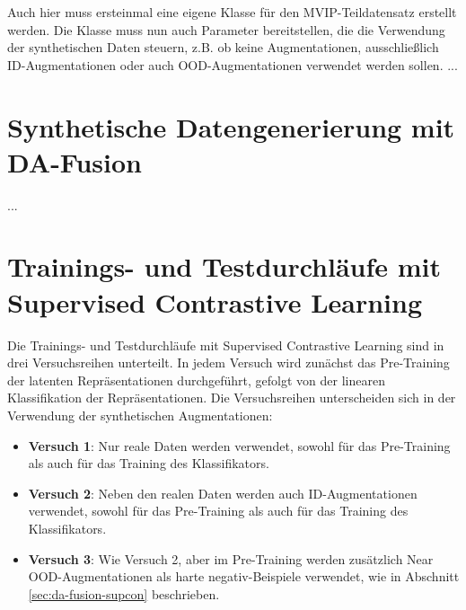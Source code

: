 Auch hier muss ersteinmal eine eigene Klasse für den MVIP-Teildatensatz erstellt werden. Die Klasse muss nun auch Parameter bereitstellen, die die Verwendung der synthetischen Daten steuern, z.B. ob keine Augmentationen, ausschließlich ID-Augmentationen oder auch OOD-Augmentationen verwendet werden sollen. ...




\section{Synthetische Datengenerierung mit DA-Fusion} \label{sec:synt-gen-da-fusion}

...

\section{Trainings- und Testdurchläufe mit Supervised Contrastive Learning} \label{sec:train-test-supcon}

Die Trainings- und Testdurchläufe mit Supervised Contrastive Learning sind in drei Versuchsreihen unterteilt. In jedem Versuch wird zunächst das Pre-Training der latenten Repräsentationen durchgeführt, gefolgt von der linearen Klassifikation der Repräsentationen. Die Versuchsreihen unterscheiden sich in der Verwendung der synthetischen Augmentationen:

\begin{itemize} %
	\item \textbf{Versuch 1}: Nur reale Daten werden verwendet, sowohl für das Pre-Training als auch für das Training des Klassifikators.
	\item \textbf{Versuch 2}: Neben den realen Daten werden auch ID-Augmentationen verwendet, sowohl für das Pre-Training als auch für das Training des Klassifikators.
	\item \textbf{Versuch 3}: Wie Versuch 2, aber im Pre-Training werden zusätzlich Near OOD-Augmentationen als harte negativ-Beispiele verwendet, wie in Abschnitt \ref{sec:da-fusion-supcon} beschrieben.
\end{itemize}

